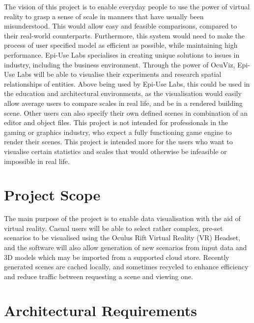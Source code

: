 \documentclass[a4paper,12pt]{article}
\begin{document}
	The vision of this project is to enable everyday people to use the power of virtual reality to grasp a sense of scale in manners that have usually been misunderstood. This would allow easy and feasible comparisons, compared to their real-world counterparts. Furthermore, this system would need to make the process of user specified model as efficient as possible, while maintaining high performance. 
	\newline\newline
	Epi-Use Labs specialises in creating unique solutions to issues in industry, including the business environment. Through the power of OcuViz, Epi-Use Labs will be able to visualise their experiments and research spatial relationships of entities.
	\newline
	Above being used by Epi-Use Labs, this could be used in the education and architectural environments, as the visualisation would easily allow average users to compare scales in real life, and be in a rendered building scene. Other users can also specify their own defined scenes in combination of an editor and object files.
	\newline
	This project is not intended for professionals in the gaming or graphics industry, who expect a fully functioning game engine to render their scenes. This project is intended more for the users who want to visualise certain statistics and scales that would otherwise be infeasible or impossible in real life.
%
%




\section{Project Scope}		%

	The main purpose of the project is to enable data visualisation with the aid of virtual reality. Casual users will be able to select rather complex, pre-set scenarios to be visualised using the Oculus Rift Virtual Reality (VR) Headset, and the software will also allow generation of new scenarios from input data and 3D models which may be imported from a supported cloud store. Recently generated scenes are cached locally, and sometimes recycled to enhance efficiency and reduce traffic between requesting a scene and viewing one.
%
%


\section{Architectural Requirements}	%
\end{document}
